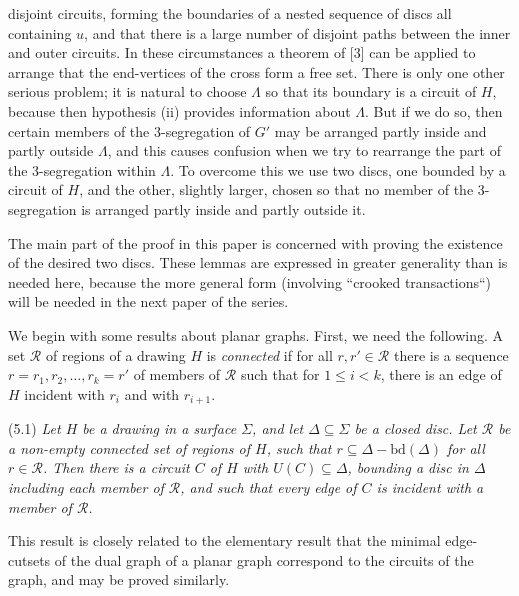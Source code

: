 \noindent disjoint circuits, forming the boundaries of a nested sequence of discs all containing $u$, and that there is a large number of disjoint paths between the inner and outer circuits. In these circumstances a theorem of [3] can be applied to arrange that the end-vertices of the cross form a free set. There is only one other serious problem; it is natural to choose $\Lambda$ so that its boundary is a circuit of $H$, because then hypothesis (ii) provides information about $\Lambda$. But if we do so, then certain members of the 3-segregation of $G'$ may be arranged partly inside and partly outside $\Lambda$, and this causes confusion when we try to rearrange the part of the 3-segregation within $\Lambda$. To overcome this we use two discs, one bounded by a circuit of $H$, and the other, slightly larger, chosen so that no member of the 3-segregation is arranged partly inside and partly outside it.

The main part of the proof in this paper is concerned with proving the existence of the desired two discs. These lemmas are expressed in greater generality than is needed here, because the more general form (involving ``crooked transactions``) will be needed in the next paper of the series.


We begin with some results about planar graphs. First, we need the following. A set $\mathscr{R}$ of regions of a drawing $H$ is \textit{connected} if for all $r, r' \in \mathscr{R}$ there is a sequence $r = r_1, r_2, \dots, r_k = r'$ of members of $\mathscr{R}$ such that for $1 \le i < k$, there is an edge of $H$ incident with $r_i$ and with $r_{i+1}$.

\stmt
(5.1) \textit{Let $H$ be a drawing in a surface $\Sigma$, and let $\Delta \subseteq \Sigma$ be a closed disc. Let $\mathscr{R}$ be a non-empty connected set of regions of $H$, such that $r \subseteq \Delta - \text{bd}(\Delta)$ for all $r \in \mathscr{R}$. Then there is a circuit $C$ of $H$ with $U(C) \subseteq \Delta$, bounding a disc in $\Delta$ including each member of $\mathscr{R}$, and such that every edge of $C$ is incident with a member of $\mathscr{R}$.}

This result is closely related to the elementary result that the minimal edge-cutsets of the dual graph of a planar graph correspond to the circuits of the graph, and may be proved similarly. 

